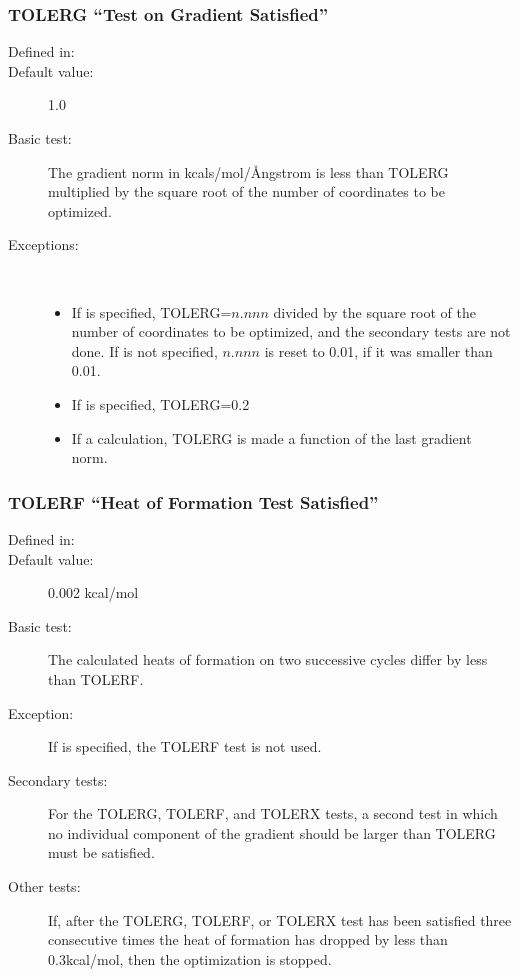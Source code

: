 \subsubsection*{TOLERG ``Test on Gradient Satisfied''}
\begin{description}
\item[Defined in:] 
\item[Default value:] 1.0
\item[Basic test:] The gradient norm in kcals/mol/\AA ngstrom is less than
TOLERG multiplied by the square root of the number of coordinates to be
optimized.
\item[Exceptions:]~
\begin{itemize}
\item If  is specified, TOLERG=$n.nnn$ divided by the square
root of the number of coordinates to be optimized, and the secondary tests are
not done.  If  is not specified, $n.nnn$ is reset to 0.01, if it was
smaller than 0.01.
\item If  is specified, TOLERG=0.2 
\item If a  calculation, TOLERG is made a function of the last
gradient  norm.
\end{itemize}
\end{description}

\subsubsection*{TOLERF ``Heat of Formation Test Satisfied''}
\begin{description}
\item[Defined in:] 
\item[Default value:] 0.002 kcal/mol
\item[Basic test:] The calculated heats of formation on two successive cycles 
differ by less than TOLERF.
\item[Exception:] If  is specified, the TOLERF test is not used.
\item[Secondary tests:] For the TOLERG, TOLERF, and TOLERX tests, a second 
test in which no individual component of the gradient should be larger than 
TOLERG must be satisfied.
\item[Other tests:] If, after the TOLERG, TOLERF, or TOLERX test has been
satisfied three consecutive times the heat of formation has dropped by less
than 0.3kcal/mol, then the optimization is stopped.
\end{description}


